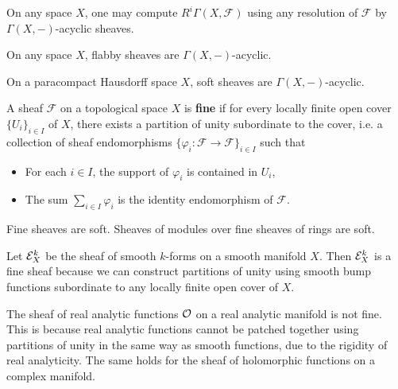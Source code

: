 \documentclass[12pt]{article}
\begin{document}
\begin{theorem}
    On any space $X$, one may compute $R^i \Gamma(X, \mathcal{F})$ using any resolution of $\mathcal{F}$ by $\Gamma(X, -)$-acyclic sheaves.
\end{theorem}

\begin{theorem}
    On any space $X$, flabby sheaves are $\Gamma(X, -)$-acyclic.
\end{theorem}

\begin{theorem}
    On a paracompact Hausdorff space $X$, soft sheaves are $\Gamma(X, -)$-acyclic.
\end{theorem}

\begin{definition}
    A sheaf $\mathcal{F}$ on a topological space $X$ is \textbf{fine} if for every locally finite open cover $\{U_i\}_{i \in I}$ of $X$, there exists a partition of unity subordinate to the cover, i.e. a collection of sheaf endomorphisms $\{\varphi_i: \mathcal{F} \to \mathcal{F}\}_{i \in I}$ such that
    \begin{itemize}
        \item For each $i \in I$, the support of $\varphi_i$ is contained in $U_i$,
        \item The sum $\sum_{i \in I} \varphi_i$ is the identity endomorphism of $\mathcal{F}$.
    \end{itemize}
\end{definition}

\begin{theorem}
    Fine sheaves are soft. Sheaves of modules over fine sheaves of rings are soft.
\end{theorem}

\begin{example}
    Let ${\mathcal{E}}^k_X$ be the sheaf of smooth $k$-forms on a smooth manifold $X$. Then ${\mathcal{E}}^k_X$ is a fine sheaf because we can construct partitions of unity using smooth bump functions subordinate to any locally finite open cover of $X$.
\end{example}

\begin{example}
    The sheaf of real analytic functions ${\mathcal{O}}$ on a real analytic manifold is not fine. This is because real analytic functions cannot be patched together using partitions of unity in the same way as smooth functions, due to the rigidity of real analyticity. The same holds for the sheaf of holomorphic functions on a complex manifold.
\end{example}
\end{document}

